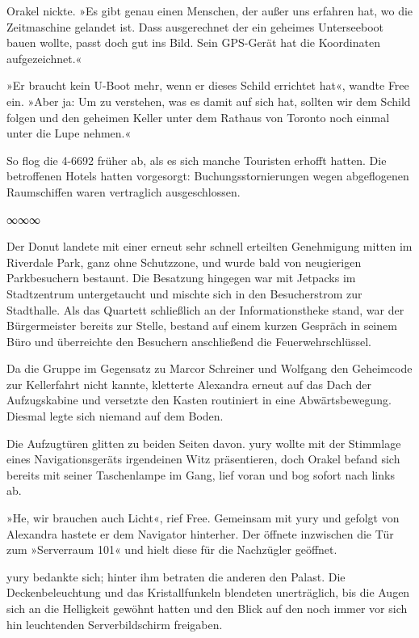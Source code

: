Orakel nickte. »Es gibt genau einen Menschen, der außer uns erfahren hat, wo die Zeitmaschine gelandet ist. Dass ausgerechnet der ein geheimes Unterseeboot bauen wollte, passt doch gut ins Bild. Sein GPS-Gerät hat die Koordinaten aufgezeichnet.«

»Er braucht kein U-Boot mehr, wenn er dieses Schild errichtet hat«, wandte Free ein. »Aber ja: Um zu verstehen, was es damit auf sich hat, sollten wir dem Schild folgen und den geheimen Keller unter dem Rathaus von Toronto noch einmal unter die Lupe nehmen.«

So flog die 4-6692 früher ab, als es sich manche Touristen erhofft hatten. Die betroffenen Hotels hatten vorgesorgt: Buchungsstornierungen wegen abgeflogenen Raumschiffen waren vertraglich ausgeschlossen.

\begin{center}
∞∞∞
\end{center}

Der Donut landete mit einer erneut sehr schnell erteilten Genehmigung mitten im Riverdale Park, ganz ohne Schutzzone, und wurde bald von neugierigen Parkbesuchern bestaunt. Die Besatzung hingegen war mit Jetpacks im Stadtzentrum untergetaucht und mischte sich in den Besucherstrom zur Stadthalle. Als das Quartett schließlich an der Informationstheke stand, war der Bürgermeister bereits zur Stelle, bestand auf einem kurzen Gespräch in seinem Büro und überreichte den Besuchern anschließend die Feuerwehrschlüssel.

Da die Gruppe im Gegensatz zu Marcor Schreiner und Wolfgang den Geheimcode zur Kellerfahrt nicht kannte, kletterte Alexandra erneut auf das Dach der Aufzugskabine und versetzte den Kasten routiniert in eine Abwärtsbewegung. Diesmal legte sich niemand auf dem Boden.


Die Aufzugtüren glitten zu beiden Seiten davon. yury wollte mit der Stimmlage eines Navigationsgeräts irgendeinen Witz präsentieren, doch Orakel befand sich bereits mit seiner Taschenlampe im Gang, lief voran und bog sofort nach links ab.

»He, wir brauchen auch Licht«, rief Free. Gemeinsam mit yury und gefolgt von Alexandra hastete er dem Navigator hinterher. Der öffnete inzwischen die Tür zum »Serverraum 101« und hielt diese für die Nachzügler geöffnet.

yury bedankte sich; hinter ihm betraten die anderen den Palast. Die Deckenbeleuchtung und das Kristallfunkeln blendeten unerträglich, bis die Augen sich an die Helligkeit gewöhnt hatten und den Blick auf den noch immer vor sich hin leuchtenden Serverbildschirm freigaben.

